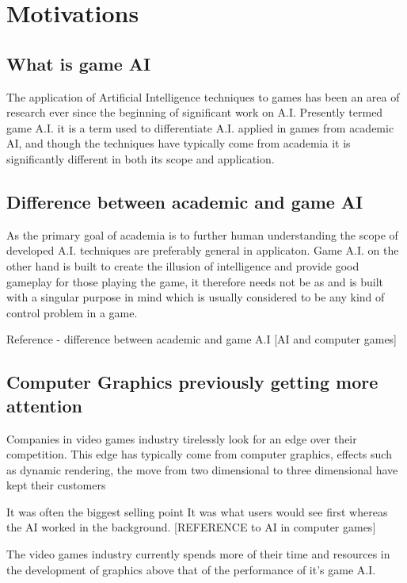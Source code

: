 \documentclass[parskip]{cs4rep}
\begin{document}
\section{Motivations}

\subsection{What is game AI}

The application of Artificial Intelligence techniques to games has been an area of research ever since the beginning of significant work on A.I. Presently termed game A.I. it is a term used to differentiate A.I. applied in games from academic AI, and though the techniques have typically come from academia it is significantly different in both its scope and application.

\subsection{Difference between academic and game AI}

As the primary goal of academia is to further human understanding the scope of developed A.I. techniques are preferably general in applicaton. Game A.I. on the other hand is built to create the illusion of intelligence and provide good gameplay for those playing the game, it therefore needs not be as and is built with a singular purpose in mind which is usually considered to be any kind of control problem in a game.

Reference - difference between academic and game A.I [AI and computer games]

\subsection{Computer Graphics previously getting more attention}

Companies in video games industry tirelessly look for an edge over their competition. This edge has typically come from computer graphics, effects such as dynamic rendering, the move from two dimensional to three dimensional have kept their customers 

It was often the biggest selling point
It was what users would see first whereas the AI worked in the background. [REFERENCE to AI in computer games]

The video games industry currently spends more of their time and resources in the development of graphics above that of the performance of it's game A.I. 
\end{document}
